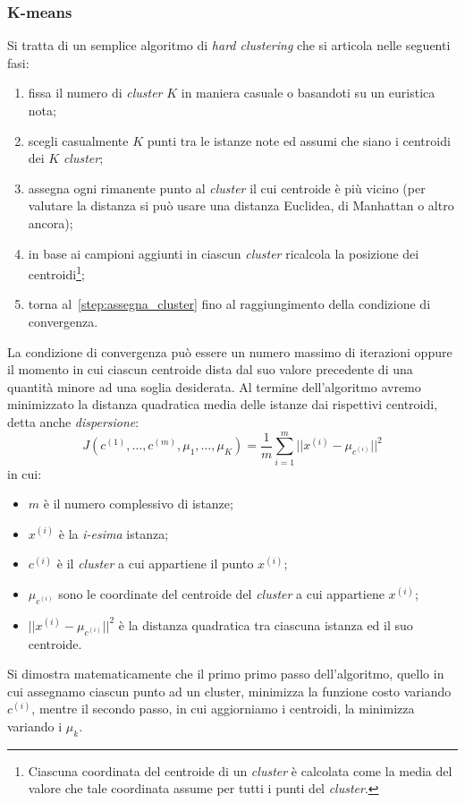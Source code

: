 \subsubsection{K-means}\label{sec:k-means}
Si tratta di un semplice algoritmo di \emph{hard clustering} che si articola nelle seguenti fasi:
\begin{enumerate}
\item fissa il numero di \emph{cluster} $K$ in maniera casuale o basandoti su un euristica nota;
\item scegli casualmente $K$  punti tra le istanze note ed assumi che siano i centroidi dei $K$  \emph{cluster};
\item\label{step:assegna_cluster} assegna ogni rimanente punto al \emph{cluster} il cui centroide è più vicino (per valutare la distanza si può usare una distanza Euclidea, di Manhattan o altro ancora);
\item in base ai campioni aggiunti in ciascun \emph{cluster} ricalcola la posizione dei centroidi\footnote{Ciascuna coordinata del centroide di un \emph{cluster} è calcolata come la media del valore che tale coordinata assume per tutti i punti del \emph{cluster}.};
\item torna al~\autoref{step:assegna_cluster} fino al raggiungimento della condizione di convergenza.
\end{enumerate}
La condizione di convergenza può essere un numero massimo di iterazioni oppure il momento in cui ciascun centroide dista dal suo valore precedente di una quantità minore ad una soglia desiderata. Al termine dell'algoritmo avremo minimizzato la distanza quadratica media delle istanze dai rispettivi centroidi, detta anche \emph{dispersione}:
\begin{equation*}
J(c^{(1)}, \dots,c^{(m)},\mu_1, \dots,\mu_K) = \frac{1}{m} \sum_{i=1}^m || x^{(i)} - \mu_{c^{(i)}} ||^2
\end{equation*}
in cui:
\begin{itemize}
\item $m$ è il numero complessivo di istanze;
\item $ x^{(i)}$ è la \emph{i-esima} istanza;
\item $c^{(i)}$ è il \emph{cluster} a cui appartiene il punto $x^{(i)}$;
\item $\mu_{c^{(i)}}$ sono le coordinate del centroide del \emph{cluster} a cui appartiene $ x^{(i)}$;
\item $|| x^{(i)} - \mu_{c^{(i)}} ||^2$ è la distanza quadratica tra ciascuna istanza ed il suo centroide.
\end{itemize}
Si dimostra matematicamente che il primo primo passo dell'algoritmo, quello in cui assegnamo ciascun punto ad un cluster, minimizza la funzione costo variando $c^{(i)}$, mentre il secondo passo, in cui aggiorniamo i centroidi, la minimizza variando i $\mu_k$.


